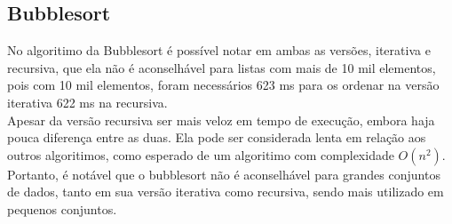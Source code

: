 \subsection{Bubblesort}
No algoritimo da Bubblesort é possível notar em ambas as versões, iterativa e recursiva, que ela não é aconselhável para listas com mais de 10 mil elementos, pois com 10 mil elementos, foram necessários 623 ms para os ordenar na versão iterativa 622 ms na recursiva. \\

Apesar da versão recursiva ser mais veloz em tempo de execução, embora haja pouca diferença entre as duas. Ela pode ser considerada lenta em relação aos outros algoritimos, como esperado de um algoritimo com complexidade $O(n^2)$. \\

Portanto, é notável que o bubblesort não é aconselhável para grandes conjuntos de dados, tanto em sua versão iterativa como recursiva, sendo mais utilizado em pequenos conjuntos.